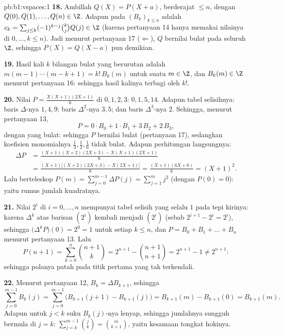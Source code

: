 \begin{solution}{pb:b1:vspaces:1}
\textbf{18.} Ambillah $Q(X) = P(X + a)$, 
berderajat $\leq n$, dengan $Q(0), Q(1), \dots, Q(n) \in \Z$. Adapun  pada
$(B_k)_{k \leq n}$ adalah $c_k = \sum_{j \leq k}(-1)^{k-j}\binom kj
Q(j) \in \Z$ (karena pertanyaan 14 hanya memakai nilainya di $0, \dots, k
\leq n$). Jadi menurut pertanyaan 17 ($\Leftarrow$), $Q$ bernilai bulat pada
seluruh $\Z$, sehingga $P(X) = Q(X - a)$ pun demikian.

\textbf{19.} Hasil kali $k$ bilangan bulat yang berurutan adalah $m(m-1)
\cdots(m-k+1) = k!\,B_k(m)$ untuk suatu $m \in \Z$, dan $B_k(m) \in
\Z$ menurut pertanyaan 16: sehingga hasil kalinya terbagi oleh $k!$.

\textbf{20.} Nilai $P = \frac{X(X+1)(2X+1)}{6}$ di $0,1,2,3$:
$0, 1, 5, 14$. Adapun tabel selisihnya: baris $\Delta$-nya $1, 4, 9$;
baris $\Delta^2$-nya $3, 5$; dan baris $\Delta^3$-nya $2$. Sehingga, menurut pertanyaan 13,
\[
P = 0\cdot B_0 + 1\cdot B_1 + 3\,B_2 + 2\,B_3 ,
\]
dengan  yang bulat: sehingga $P$ bernilai bulat (pertanyaan 17),
sedangkan koefisien monomialnya $\frac13, \frac12, \frac16$
tidak bulat. Adapun perhitungan langsungnya:
\begin{align*}
\Delta P &= \frac{(X+1)(X+2)(2X+3) - X(X+1)(2X+1)}{6} \\
&= \frac{(X+1)\bigl[(X+2)(2X+3) - X(2X+1)\bigr]}{6}
= \frac{(X+1)(6X+6)}{6} = (X+1)^2 .
\end{align*}
Lalu berteleskop $P(m) = \sum_{j=0}^{m-1}\Delta P(j) = \sum_{j=1}^{m}
j^2$ (dengan $P(0) = 0$): yaitu rumus jumlah kuadratnya.

\textbf{21.} Nilai $2^i$ di $i = 0, \dots, n$ mempunyai tabel
selisih yang selalu $1$ pada tepi kirinya: karena $\Delta^k$ atas barisan
$(2^i)$ kembali menjadi $(2^i)$ (sebab $2^{i+1} - 2^i = 2^i$), sehingga
$\bigl(\Delta^k P\bigr)(0) = 2^0 = 1$ untuk setiap $k \leq n$, dan $P =
B_0 + B_1 + \dots + B_n$ menurut pertanyaan 13. Lalu
\[
P(n+1) = \sum_{k=0}^{n}\binom{n+1}{k}
= 2^{n+1} - \binom{n+1}{n+1} = 2^{n+1} - 1 \neq 2^{n+1}:
\]
sehingga polanya patah pada titik pertama yang tak terkendali.

\textbf{22.} Menurut pertanyaan 12, $B_k = \Delta B_{k+1}$, sehingga
\[
\sum_{j=0}^{m-1} B_k(j)
= \sum_{j=0}^{m-1}\bigl(B_{k+1}(j+1) - B_{k+1}(j)\bigr)
= B_{k+1}(m) - B_{k+1}(0) = B_{k+1}(m).
\]
Adapun untuk $j < k$ suku $B_k(j)$-nya lenyap, sehingga jumlahnya sungguh bermula di
$j = k$: $\sum_{j=k}^{m-1}\binom jk = \binom m{k+1}$, yaitu
kesamaan tongkat hokinya.


\end{solution}
